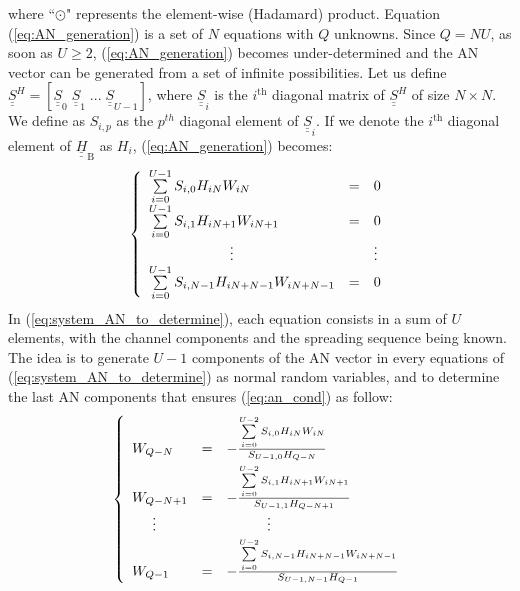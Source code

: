 \documentclass[a4paper,11pt]{article}
\def\uu#1{\underline{\underline{#1}}}
\begin{document}
where ``$\odot$" represents the element-wise (Hadamard) product. Equation (\ref{eq:AN_generation}) is a set of $N$ equations with $Q$ unknowns. Since $Q = NU$, as soon as $U\geq 2$, (\ref{eq:AN_generation}) becomes under-determined and the AN vector can be generated from a set of infinite possibilities. Let us define $\uu{S}^H = [\uu{S}_0 \; \uu{S}_1 \; ... \; \uu{S}_{U-1}]$, where $\uu{S}_i$ is the $i^{\text{th}}$ diagonal matrix of $\uu{S}^H$ of size $N\times N$. We define as $S_{i,p}$ as the $p^{th}$ diagonal element of $\uu{S}_i$. If we denote the $i^{\text{th}}$ diagonal element of $\uu{H}_{\text{B}}$ as $H_i$, (\ref{eq:AN_generation}) becomes: 
\begin{equation}
\setlength{\jot}{15pt}
\begin{split}
\left\{
\begin{array}{lll}
    \sum\limits_{i=0}^{\small{U-1}} S_{i,0} H_{iN} W_{iN} &=& 0 \\[2pt]
    \sum\limits_{i=0}^{U-1} S_{i,1}H_{iN+1} W_{iN+1} &=& 0 \\[2pt]
    \hspace{.8in}\vdots  && \vdots \\
    \sum\limits_{i=0}^{U-1} S_{i,N-1}H_{iN +N-1} W_{iN+N-1} &=& 0
\end{array}
\right.
\end{split}
\label{eq:system_AN_to_determine}
\end{equation}
In (\ref{eq:system_AN_to_determine}), each equation consists in a sum of $U$ elements, with the channel components and the spreading sequence being known. The idea is to generate $U-1$ components of the AN vector in every equations of (\ref{eq:system_AN_to_determine}) as normal random variables, and to determine the last AN components that ensures (\ref{eq:an_cond}) as follow:
\begin{equation}
\setlength{\jot}{5pt}
\begin{split}
\left\{
\begin{array}{lll}
    W_{Q-N}  &=& - \frac{\sum\limits_{i=0}^{U-2}  S_{i,0} H_{iN} W_{iN}}{ S_{U-1,0} H_{Q-N}} \\[5pt]
    W_{Q-N+1}& =&  - \frac {\sum\limits_{i=0}^{U-2}  S_{i,1}H_{iN+1} W_{iN+1}}{ S_{U-1,1}H_{Q-N+1}} \\[2pt]
    \hspace{.2in} \vdots  &&  \hspace{.4in} \vdots \\[2pt]
    W_{Q-1} &=&  - \frac{\sum\limits_{i=0}^{U-2}  S_{i,N-1}H_{iN +N-1} W_{iN+N-1}}{ S_{U-1,N-1}H_{Q-1}}
\end{array}
\right.
\end{split}
\label{eq:system_AN_determined}
\end{equation}
\end{document}
